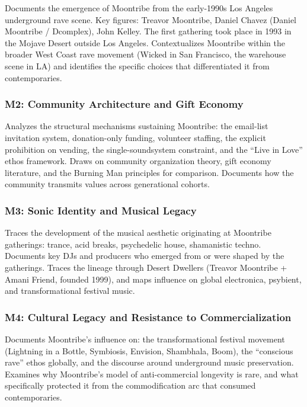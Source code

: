 \documentclass[11pt,letterpaper]{article}
\begin{document}
Documents the emergence of Moontribe from the early-1990s Los Angeles underground rave scene. Key figures: Treavor Moontribe, Daniel Chavez (Daniel Moontribe / Dcomplex), John Kelley. The first gathering took place in 1993 in the Mojave Desert outside Los Angeles. Contextualizes Moontribe within the broader West Coast rave movement (Wicked in San Francisco, the warehouse scene in LA) and identifies the specific choices that differentiated it from contemporaries.

\subsubsection{M2: Community Architecture and Gift Economy}

Analyzes the structural mechanisms sustaining Moontribe: the email-list invitation system, donation-only funding, volunteer staffing, the explicit prohibition on vending, the single-soundsystem constraint, and the ``Live in Love'' ethos framework. Draws on community organization theory, gift economy literature, and the Burning Man principles for comparison. Documents how the community transmits values across generational cohorts.

\subsubsection{M3: Sonic Identity and Musical Legacy}

Traces the development of the musical aesthetic originating at Moontribe gatherings: trance, acid breaks, psychedelic house, shamanistic techno. Documents key DJs and producers who emerged from or were shaped by the gatherings. Traces the lineage through Desert Dwellers (Treavor Moontribe + Amani Friend, founded 1999), and maps influence on global electronica, psybient, and transformational festival music.

\subsubsection{M4: Cultural Legacy and Resistance to Commercialization}

Documents Moontribe's influence on: the transformational festival movement (Lightning in a Bottle, Symbiosis, Envision, Shambhala, Boom), the ``conscious rave'' ethos globally, and the discourse around underground music preservation. Examines why Moontribe's model of anti-commercial longevity is rare, and what specifically protected it from the commodification arc that consumed contemporaries.
\end{document}
